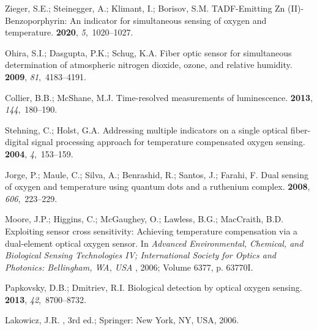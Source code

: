 \documentclass[sensors,article,accept,moreauthors,pdftex,10pt,a4paper]{Definitions/mdpi}
\theoremstyle{definition}
\begin{document}
\begin{thebibliography}{999}
Zieger, S.E.; Steinegger, A.; Klimant, I.; Borisov, S.M.
\newblock TADF-Emitting Zn (II)-Benzoporphyrin: An indicator for simultaneous
  sensing of oxygen and temperature.
 {\bf 2020}, {\em 5},~1020--1027.

Ohira, S.I.; Dasgupta, P.K.; Schug, K.A.
\newblock Fiber optic sensor for simultaneous determination of atmospheric
  nitrogen dioxide, ozone, and relative humidity.
 {\bf 2009}, {\em 81},~4183--4191.

Collier, B.B.; McShane, M.J.
\newblock Time-resolved measurements of luminescence.
 {\bf 2013}, {\em 144},~180--190.

Stehning, C.; Holst, G.A.
\newblock Addressing multiple indicators on a single optical fiber-digital
  signal processing approach for temperature compensated oxygen sensing.
 {\bf 2004}, {\em 4},~153--159.

Jorge, P.; Maule, C.; Silva, A.; Benrashid, R.; Santos, J.; Farahi, F.
\newblock Dual sensing of oxygen and temperature using quantum dots and a
  ruthenium complex.
 {\bf 2008}, {\em 606},~223--229.

Moore, J.P.; Higgins, C.; McGaughey, O.; Lawless, B.G.; MacCraith, B.D.
\newblock Exploiting sensor cross sensitivity: Achieving temperature
  compensation via a dual-element optical oxygen sensor.
\newblock  In \emph{Advanced Environmental, Chemical, and Biological Sensing
  Technologies IV; International Society for Optics and Photonics: Bellingham, WA, USA} %
,  2006; Volume
  6377, p. 63770I.

Papkovsky, D.B.; Dmitriev, R.I.
\newblock Biological detection by optical oxygen sensing.~ {\bf 2013}, {\em 42},~8700--8732.

Lakowicz, J.R.
, 3rd ed.; Springer: New
  York, NY, USA,  2006.


\end{thebibliography}
\end{document}
